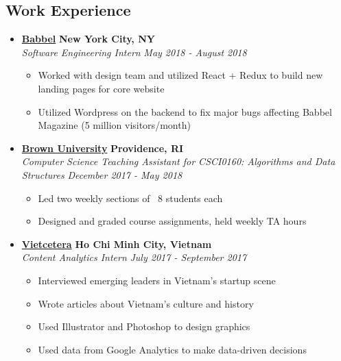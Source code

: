 \documentclass[10pt,letterpaper]{article}
\begin{document}
\subsection*{Work Experience}
  \begin{itemize}
    \parskip=-0.5em

    \item[]
    {\href{https://www.babbel.com/}{\textbf{Babbel}} \hfill
      \textbf{New York City, NY}}
    \\
    {\emph{Software Engineering Intern} \hfill \emph{May 2018 - August 2018}}

    \begin{itemize}[label=\textbullet]
      \itemsep0em
      \item Worked with design team and utilized React + Redux to build new landing pages for core website
      \item Utilized Wordpress on the backend to fix major bugs affecting Babbel Magazine (5 million visitors/month)
    \end{itemize}


    \item[]
    {\href{https://www.brown.edu/}{\textbf{Brown University}} \hfill
      \textbf{Providence, RI}}
    \\
    {\emph{Computer Science Teaching Assistant for CSCI0160: Algorithms and Data Structures} \hfill \emph{December 2017 - May 2018}}

    \begin{itemize}[label=\textbullet]
      \itemsep0em
      \item Led two weekly sections of ~8 students each
      \item Designed and graded course assignments, held weekly TA hours
    \end{itemize}

    \item[]
    {\href{http://vietcetera.com/}{\textbf{Vietcetera}} \hfill
      \textbf{Ho Chi Minh City, Vietnam}}
    \\
    {\emph{Content Analytics Intern} \hfill \emph{July 2017 - September 2017}}

    \begin{itemize}[label=\textbullet]
      \itemsep0em
      \item Interviewed emerging leaders in Vietnam's startup scene
      \item Wrote articles about Vietnam's culture and history
      \item Used Illustrator and Photoshop to design graphics
      \item Used data from Google Analytics to make data-driven decisions
    \end{itemize}


\end{itemize}
\end{document}
